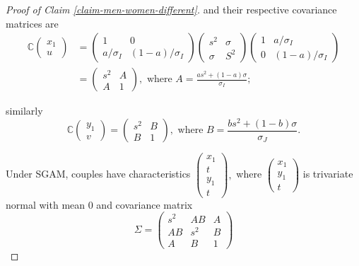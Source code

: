 \documentclass[
  12pt,
]{article}
\theoremstyle{definition}
\theoremstyle{definition}
\theoremstyle{definition}
\theoremstyle{definition}
\theoremstyle{remark}
\begin{document}
\begin{proof}[Proof of Claim \ref{claim-men-women-different}]
and their respective covariance matrices are
\begin{align*}
\mathbb{C}\left(\begin{array}{c}
x_{1}\\
u
\end{array}\right) & =\left(\begin{array}{cc}
1 & 0\\
a/\sigma_{I} & (1-a)/\sigma_{I}
\end{array}\right)\left(\begin{array}{cc}
s^{2} & \sigma\\
\sigma & S^{2}
\end{array}\right)\left(\begin{array}{cc}
1 & a/\sigma_{I}\\
0 & (1-a)/\sigma_{I}
\end{array}\right)\\
 & =\left(\begin{array}{cc}
s^{2} & A \\
A & 1
\end{array}\right), \textrm{ where } A=\frac{as^{2}+(1-a)\sigma}{\sigma_{I}};
\end{align*}

similarly
\[
\mathbb{C}\left(\begin{array}{c}
y_{1}\\
v
\end{array}\right)=\left(\begin{array}{cc}
s^{2} & B \\
B & 1
\end{array}\right), \textrm{ where } B=\frac{bs^{2}+(1-b)\sigma}{\sigma_{J}}.
\]

Under SGAM, couples have characteristics $\left(\begin{array}{c}
x_{1}\\
t\\
y_{1}\\
t
\end{array}\right),$ where $\left(\begin{array}{c}
x_{1}\\
y_{1}\\
t
\end{array}\right)$ is trivariate normal with mean 0 and covariance matrix
\[
\Sigma=\left(\begin{array}{ccc}
s^{2} & AB & A\\
AB & s^{2} & B\\
A & B & 1
\end{array}\right)
\]



\end{proof}
\end{document}
